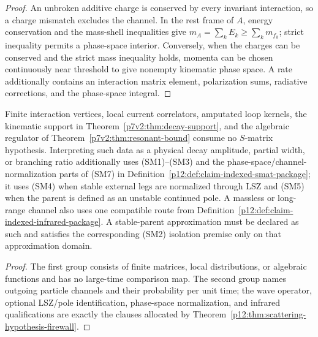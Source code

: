 \documentclass[11pt,a4paper]{article}
\begin{document}
\begin{proof}
An unbroken additive charge is conserved by every invariant interaction, so a
charge mismatch excludes the channel.  In the rest frame of \(A\), energy
conservation and the mass-shell inequalities give
\(m_A=\sum_kE_k\geq\sum_km_{f_k}\); strict inequality permits a phase-space
interior.  Conversely, when the charges can be conserved and the strict mass
inequality holds, momenta can be chosen continuously near threshold to give
nonempty kinematic phase space.  A rate additionally contains an interaction
matrix element, polarization sums, radiative corrections, and the
phase-space integral.
\end{proof}

\begin{proposition}
\label{p7v2:prop:claim-scoped-decay-boundary}
Finite interaction vertices, local current correlators, amputated loop kernels,
the kinematic support in Theorem~\ref{p7v2:thm:decay-support}, and the algebraic
regulator of Theorem~\ref{p7v2:thm:resonant-bound} consume no \(S\)-matrix
hypothesis.  Interpreting such data as a physical decay amplitude, partial
width, or branching ratio additionally uses \textnormal{(SM1)--(SM3)} and the
phase-space/channel-normalization parts of \textnormal{(SM7)} in
Definition~\ref{p12:def:claim-indexed-smat-package}; it uses
\textnormal{(SM4)} when stable external legs are normalized through LSZ and
\textnormal{(SM5)} when the parent is defined as an unstable continued pole.
A massless or long-range channel also uses one compatible route from
Definition~\ref{p12:def:claim-indexed-infrared-package}.  A stable-parent
approximation must be declared as such and satisfies the corresponding
\textnormal{(SM2)} isolation premise only on that approximation domain.
\end{proposition}

\begin{proof}
The first group consists of finite matrices, local distributions, or algebraic
functions and has no large-time comparison map.  The second group names
outgoing particle channels and their probability per unit time; the wave
operator, optional LSZ/pole identification, phase-space normalization, and
infrared qualifications are exactly the clauses allocated by
Theorem~\ref{p12:thm:scattering-hypothesis-firewall}.
\end{proof}
\end{document}
